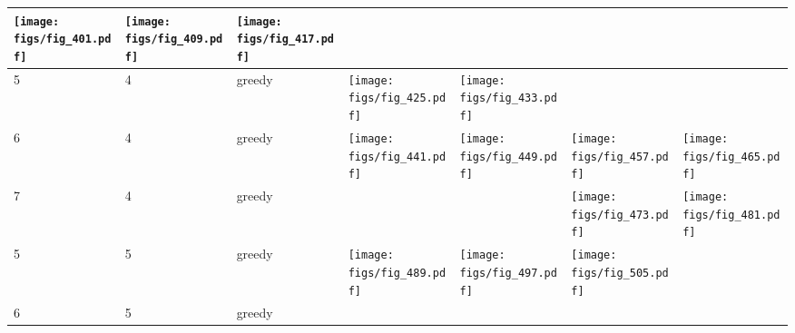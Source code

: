 \documentclass[oneside,canadian,landscape]{article}
\begin{document}
\begin{center}
\begin{longtable}{|l|l|l||l|l|l|l|}
\begin{minipage}{3.5cm}
\texttt{[image: figs/fig\_401.pdf]}
\end{minipage}
&\begin{minipage}{3.5cm}
\texttt{[image: figs/fig\_409.pdf]}
\end{minipage}
&\begin{minipage}{3.5cm}
\texttt{[image: figs/fig\_417.pdf]}
\end{minipage}
\\ \hline
5&4&greedy&\begin{minipage}{3.5cm}
\texttt{[image: figs/fig\_425.pdf]}
\end{minipage}
&\begin{minipage}{3.5cm}
\texttt{[image: figs/fig\_433.pdf]}
\end{minipage}
&&\\ \hline
6&4&greedy&\begin{minipage}{3.5cm}
\texttt{[image: figs/fig\_441.pdf]}
\end{minipage}
&\begin{minipage}{3.5cm}
\texttt{[image: figs/fig\_449.pdf]}
\end{minipage}
&\begin{minipage}{3.5cm}
\texttt{[image: figs/fig\_457.pdf]}
\end{minipage}
&\begin{minipage}{3.5cm}
\texttt{[image: figs/fig\_465.pdf]}
\end{minipage}
\\ \hline
7&4&greedy&&&\begin{minipage}{3.5cm}
\texttt{[image: figs/fig\_473.pdf]}
\end{minipage}
&\begin{minipage}{3.5cm}
\texttt{[image: figs/fig\_481.pdf]}
\end{minipage}
\\ \hline
5&5&greedy&\begin{minipage}{3.5cm}
\texttt{[image: figs/fig\_489.pdf]}
\end{minipage}
&\begin{minipage}{3.5cm}
\texttt{[image: figs/fig\_497.pdf]}
\end{minipage}
&\begin{minipage}{3.5cm}
\texttt{[image: figs/fig\_505.pdf]}
\end{minipage}
&\\ \hline
6&5&greedy&&\begin{minipage}{3.5cm}

\end{minipage}
\end{longtable}
\end{center}
\end{document}
